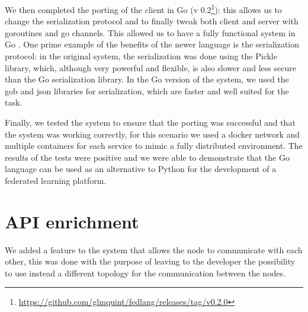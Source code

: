 We then completed the porting of the client in Go (v 0.2\footnote{\url{https://github.com/glmquint/fedlang/releases/tag/v0.2.0}}): this allows us to change the serialization protocol and to finally tweak both client and server with goroutines and go channels. This allowed us to have a fully functional system in Go . One prime example of the benefits of the newer language is the serialization protocol: in the original system, the serialization was done using the Pickle library, which, although very powerful and flexible, is also slower and less secure than the Go serialization library. In the Go version of the system, we used the gob and json libraries for serialization, which are faster and well suited for the task.

Finally, we tested the system to ensure that the porting was successful and that the system was working correctly, for this scenario we used a docker network and multiple containers for each service to mimic a fully distributed environment. The results of the tests were positive and we were able to demonstrate that the Go language can be used as an alternative to Python for the development of a federated learning platform.

\section{API enrichment}
We added a feature to the system that allows the node to communicate with each other, this was done with the purpose of leaving to the developer the possibility to use instead a different topology for the communication between the nodes. 
